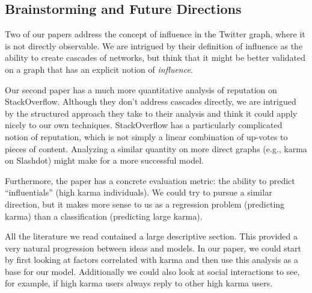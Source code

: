 \documentclass[10pt]{article}
\begin{document}

\subsection{Brainstorming and Future Directions}
Two of our papers address the concept of influence in the Twitter graph, where it is
not directly observable. We are intrigued by their definition of influence as the ability
to create cascades of networks, but think that it might be better validated on a graph
that has an explicit notion of \textit{influence}.


Our second paper has a much more quantitative analysis of reputation on StackOverflow.
Although they don't address cascades directly, we are intrigued by the structured approach
they take to their analysis and think it could apply nicely to our own techniques.
StackOverflow has a particularly complicated notion of reputation, which is not simply
a linear combination of up-votes to pieces of content. Analyzing a similar quantity
on more direct graphs (e.g., karma on Slashdot) might make for a more successful
model.

Furthermore, the paper has a concrete evaluation metric: the ability to predict 
``influentials'' (high karma individuals). We could try to pursue a similar direction,
but it makes more sense to us as a regression problem (predicting karma) than a classification
(predicting large karma).

All the literature we read contained a large descriptive section. This provided a very
natural progression between ideas and models. In our paper, we could start by first
looking at factors correlated with karma and then use this analysis as a base
for our model. Additionally we could also look at social interactions to see, for example,
if high karma users always reply to other high karma users.



\end{document}
